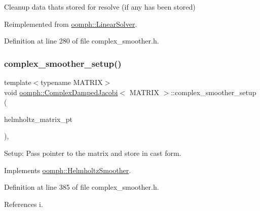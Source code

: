 Cleanup data that\textquotesingle{}s stored for resolve (if any has been stored) 



Reimplemented from \hyperlink{classoomph_1_1LinearSolver_a9d66f3262e80ca06a365f98216afd85f}{oomph\+::\+Linear\+Solver}.



Definition at line 280 of file complex\+\_\+smoother.\+h.

\mbox{\label{classoomph_1_1ComplexDampedJacobi_a9a322c00b8e352ad37db87a23a1ec6e3}} 
\subsubsection{\texorpdfstring{complex\+\_\+smoother\+\_\+setup()}{complex\_smoother\_setup()}}
{\footnotesize\ttfamily template$<$typename M\+A\+T\+R\+IX$>$ \\
void \hyperlink{classoomph_1_1ComplexDampedJacobi}{oomph\+::\+Complex\+Damped\+Jacobi}$<$ M\+A\+T\+R\+IX $>$\+::complex\+\_\+smoother\+\_\+setup (\begin{DoxyParamCaption}\item[{\hyperlink{classoomph_1_1Vector}{Vector}$<$ \hyperlink{classoomph_1_1CRDoubleMatrix}{C\+R\+Double\+Matrix} $\ast$$>$}]{helmholtz\+\_\+matrix\+\_\+pt }\end{DoxyParamCaption})\hspace{0.3cm}{\ttfamily [inline]}, {\ttfamily [virtual]}}



Setup\+: Pass pointer to the matrix and store in cast form. 



Implements \hyperlink{classoomph_1_1HelmholtzSmoother_a7fffc8d9a93fa5ca0a3e21c972ea3c05}{oomph\+::\+Helmholtz\+Smoother}.



Definition at line 385 of file complex\+\_\+smoother.\+h.



References i.

\mbox{\label{classoomph_1_1ComplexDampedJacobi_a3e548db0f775e4239ff7b9c76a7b1c76}} 
